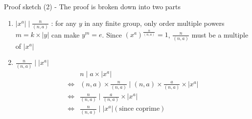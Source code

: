\documentclass[titlepage, 12pt]{book}
\begin{document}
Proof sketch (2) - The proof is broken down into two parts
\begin{enumerate}
    \item $|x^a|\mid\frac{n}{(n, a)}$ : for any $y$ in any finite group, only
        order multiple powers $m = k\times |y|$ can make $y^m = e$. Since
        $(x^a)^{\frac{n}{(n, a)}} = 1$,
        $\frac{n}{(n, a)}$ must be a multiple of $|x^a|$ 
    \item $\frac{n}{(n, a)}\mid|x^a|$
        \begin{align*}
                 & n\mid a\times |x^a|\\
            \iff & (n, a)\times\frac{n}{(n, a)}\mid (n, a)\times\frac{a}{(n, a)}\times|x^a|\\
            \iff & \frac{n}{(n, a)}\mid \frac{a}{(n, a)}\times|x^a|\\
            \iff & \frac{n}{(n, a)}\mid|x^a| (\textrm{since coprime})
        \end{align*}
\end{enumerate}
\end{document}
